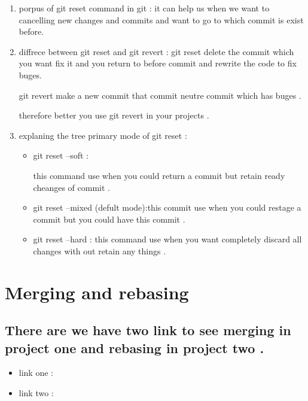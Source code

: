 \documentclass{article}
\begin{document}
\begin{enumerate}
    \item porpus of git reset command in git :
    it can help us when we want to cancelling new changes and commits and want to go to which commit is exist before.
    \item diffrece between git reset and git revert :
    git reset delete the commit which you want fix it and you return to before commit and rewrite the code to fix buges.

    git revert make a new commit that commit neutre commit which has buges .
    
    therefore better you use git revert in your projects .
    \item explaning the tree primary mode of git reset :

\begin{itemize}
    \item git reset --soft :

    this command use when you could return a commit but retain ready cheanges of commit .
    \item git reset --mixed (defult mode):this commit use when you could restage a commit but you could have this commit . 
    \item git reset --hard :
    this command use when you want completely discard all changes with out retain any things . 
    
\end{itemize}
    
\end{enumerate}

\section*{Merging and rebasing}

\subsection*{There are we have two link to see merging in project one and rebasing in project two . }

\begin{itemize}
\item link one :

\item link two :
\end{itemize}
\end{document}
